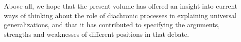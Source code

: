 \documentclass[output=paper]{langsci/langscibook}
\begin{document}
Above all, we hope that the present volume has offered an insight into current ways of thinking about the role of diachronic processes in explaining universal generalizations, and that it has contributed to specifying the arguments, strengths and weaknesses of different positions in that debate.

\sloppy
\printbibliography[heading=subbibliography,notkeyword=this]
\end{document}

